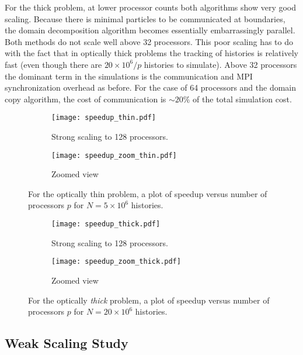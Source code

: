 \documentclass[12pt]{article}
\begin{document}
{{{For the thick problem, at lower processor counts both algorithms show very good
scaling. Because there is minimal particles to be communicated at boundaries, the domain decomposition
algorithm becomes essentially embarrassingly parallel.  Both methods do not scale
well above 32 processors. This poor scaling has to do with the fact that in optically
thick problems the tracking of histories is relatively fast (even though there are
$20\times 10^6/p$ histories to simulate).  Above 32 processors the dominant term in
the simulations is the communication and MPI synchronization overhead as before.  For the case of 64 processors and
the domain copy algorithm, the cost of communication is $\sim20 \%$ of the total
simulation cost.
\clearpage
\begin{figure}[p!]
    \begin{subfigure}{0.5\textwidth}
         \centering
           \texttt{[image: speedup\_thin.pdf]}
           \caption{Strong scaling to 128 processors.}
     \end{subfigure}
     \begin{subfigure}{0.5\textwidth}
         \centering
           \texttt{[image: speedup\_zoom\_thin.pdf]}
           \caption{Zoomed view}
     \end{subfigure}
           \caption{For the optically thin problem, a plot of speedup versus number of processors $p$ for $N=5\times
               10^6$ histories.\label{thinsu}}
 \end{figure}
     \begin{figure}[htbp!]
         \begin{subfigure}{0.5\textwidth}
         \centering
           \texttt{[image: speedup\_thick.pdf]}
           \caption{Strong scaling to 128 processors.}
     \end{subfigure}
     \begin{subfigure}{0.5\textwidth}
         \centering
           \texttt{[image: speedup\_zoom\_thick.pdf]}
           \caption{Zoomed view}
     \end{subfigure}
     \caption{For the optically \emph{thick} problem, a plot of speedup versus number
            of processors $p$ for $N=20\times 10^6$ histories.\label{thicksu}} \end{figure}
  
\clearpage

\subsection{Weak Scaling Study}

}}}
\end{document}
